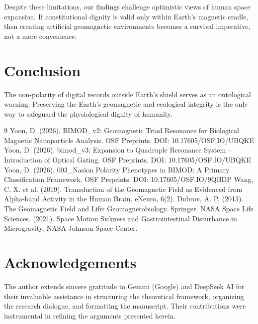 \documentclass[12pt, a4paper]{article}
\begin{document}
Despite these limitations, our findings challenge optimistic views of human space expansion. If constitutional dignity is valid only within Earth's magnetic cradle, then creating artificial geomagnetic environments becomes a survival imperative, not a mere convenience.

\section{Conclusion}
The non-polarity of digital records outside Earth's shield serves as an ontological warning. Preserving the Earth's geomagnetic and ecological integrity is the only way to safeguard the physiological dignity of humanity.

\begin{thebibliography}{9}
 Yoon, D. (2026). BIMOD\_v2: Geomagnetic Triad Resonance for Biological Magnetic Nanoparticle Analysis. OSF Preprints. DOI: 10.17605/OSF.IO/UBQKE
 Yoon, D. (2026). bimod\_v3: Expansion to Quadruple Resonance System – Introduction of Optical Gating. OSF Preprints. DOI: 10.17605/OSF.IO/UBQKE
 Yoon, D. (2026). 003\_Nasion Polarity Phenotypes in BIMOD: A Primary Classification Framework. OSF Preprints. DOI: 10.17605/OSF.IO/9QBDP
 Wang, C. X. et al. (2019). Transduction of the Geomagnetic Field as Evidenced from Alpha-band Activity in the Human Brain. eNeuro, 6(2).
 Dubrov, A. P. (2013). The Geomagnetic Field and Life: Geomagnetobiology. Springer.
 NASA Space Life Sciences. (2021). Space Motion Sickness and Gastrointestinal Disturbance in Microgravity. NASA Johnson Space Center.
\end{thebibliography}

\section*{Acknowledgements}
The author extends sincere gratitude to Gemini (Google) and DeepSeek AI for their invaluable assistance in structuring the theoretical framework, organizing the research dialogue, and formatting the manuscript. Their contributions were instrumental in refining the arguments presented herein.
\end{document}

